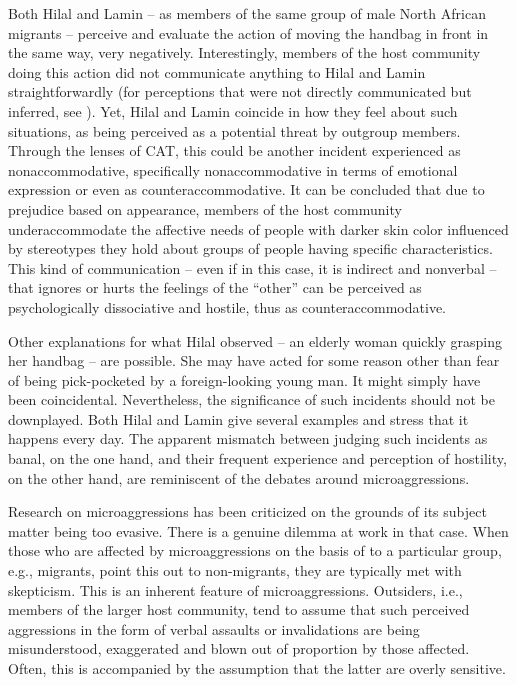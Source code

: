 \documentclass[output=paper,colorlinks,citecolor=brown]{langscibook}
\begin{document}
Both Hilal and Lamin -- as members of the same group of male North African migrants -- perceive and evaluate the action of moving the handbag in front in the same way, very negatively. Interestingly, members of the host community doing this action did not communicate anything to Hilal and Lamin straightforwardly (for perceptions that were not directly communicated but inferred, see \citealt{petrou_dragojevic2024}). Yet, Hilal and Lamin coincide in how they feel about such situations, as being perceived as a potential threat by outgroup members. Through the lenses of CAT, this could be another incident experienced as nonaccommodative, specifically nonaccommodative in terms of emotional expression or even as counteraccommodative. It can be concluded that due to prejudice based on appearance, members of the host community underaccommodate the affective needs of people with darker skin color influenced by stereotypes they hold about groups of people having specific characteristics. This kind of communication -- even if in this case, it is indirect and nonverbal -- that ignores or hurts the feelings of the ``other'' can be perceived as psychologically dissociative and hostile, thus as counteraccommodative. 

Other explanations for what Hilal observed -- an elderly woman quickly grasping her handbag -- are possible. She may have acted for some reason other than fear of being pick-pocketed by a foreign-looking young man. It might simply have been coincidental. Nevertheless, the significance of such incidents should not be downplayed. Both Hilal and Lamin give several examples and stress that it happens every day. The apparent mismatch between judging such incidents as banal, on the one hand, and their frequent experience and perception of hostility, on the other hand, are reminiscent of the debates around microaggressions. 

Research on microaggressions has been criticized on the grounds of its subject matter being too evasive. There is a genuine dilemma at work in that case. When those who are affected by microaggressions on the basis of  to a particular group, e.g., migrants, point this out to non-migrants, they are typically met with skepticism. This is an inherent feature of microaggressions. Outsiders, i.e., members of the larger host community, tend to assume that such perceived aggressions in the form of verbal assaults or invalidations are being misunderstood, exaggerated and blown out of proportion by those affected. Often, this is accompanied by the assumption that the latter are overly sensitive. 
\end{document}

